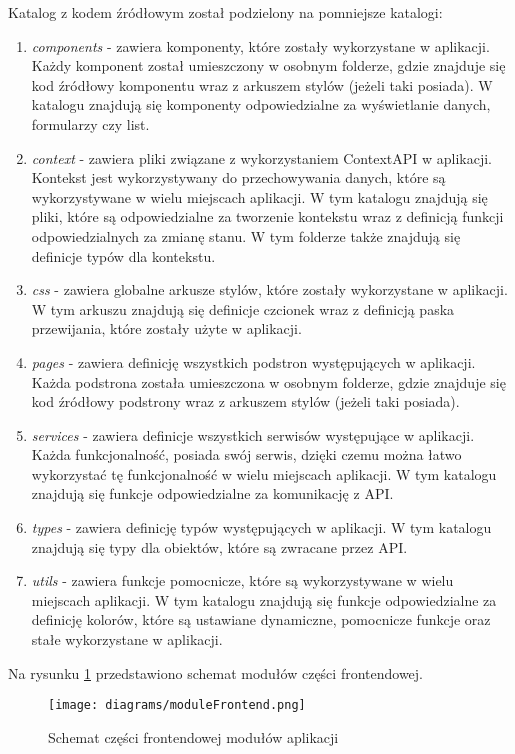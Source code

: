 Katalog z kodem źródłowym został podzielony na pomniejsze katalogi:
\begin{enumerate}
    \item \textit{components} - zawiera komponenty, które zostały wykorzystane w aplikacji. Każdy komponent został umieszczony w osobnym folderze, gdzie znajduje się kod źródłowy komponentu wraz z arkuszem stylów (jeżeli taki posiada). W katalogu znajdują się komponenty odpowiedzialne za wyświetlanie danych, formularzy czy list.
    \item \textit{context} - zawiera pliki związane z wykorzystaniem ContextAPI \cite{React_context} w aplikacji. Kontekst jest wykorzystywany do przechowywania danych, które są wykorzystywane w wielu miejscach aplikacji. W tym katalogu znajdują się pliki, które są odpowiedzialne za tworzenie kontekstu wraz z definicją funkcji odpowiedzialnych za zmianę stanu. W tym folderze także znajdują się definicje typów dla kontekstu.
    \item \textit{css} - zawiera globalne arkusze stylów, które zostały wykorzystane w aplikacji. W tym arkuszu znajdują się definicje czcionek wraz z definicją paska przewijania, które zostały użyte w aplikacji.
    \item \textit{pages} - zawiera definicję wszystkich podstron występujących w aplikacji. Każda podstrona została umieszczona w osobnym folderze, gdzie znajduje się kod źródłowy podstrony wraz z arkuszem stylów (jeżeli taki posiada).
    \item \textit{services} - zawiera definicje wszystkich serwisów występujące w aplikacji. Każda funkcjonalność, posiada swój serwis, dzięki czemu można łatwo wykorzystać tę funkcjonalność w wielu miejscach aplikacji. W tym katalogu znajdują się funkcje odpowiedzialne za komunikację z API.
    \item \textit{types} - zawiera definicję typów występujących w aplikacji. W tym katalogu znajdują się typy dla obiektów, które są zwracane przez API.
    \item \textit{utils} - zawiera funkcje pomocnicze, które są wykorzystywane w wielu miejscach aplikacji. W tym katalogu znajdują się funkcje odpowiedzialne za definicję kolorów, które są ustawiane dynamiczne, pomocnicze funkcje oraz stałe wykorzystane w aplikacji.
\end{enumerate}

Na rysunku \ref{module_frontend} przedstawiono schemat modułów części frontendowej.

\begin{figure}[H]
    \centering
    \texttt{[image: diagrams/moduleFrontend.png]}
    \caption{Schemat części frontendowej modułów aplikacji}
    \label{module_frontend}
\end{figure}

